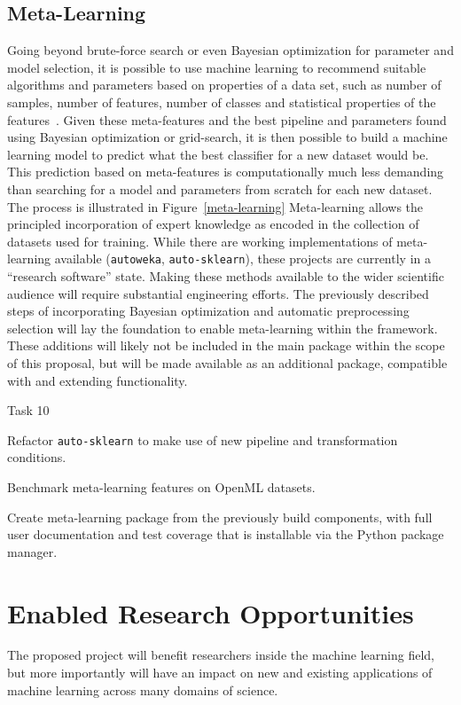 \subsection{Meta-Learning}
Going beyond brute-force search or even Bayesian optimization for parameter and
model selection, it is possible to use machine learning to recommend suitable
algorithms and parameters based on properties of a data set, such as number of
samples, number of features, number of classes and statistical properties of
the features~\autocite{luo2015review, feurer-nips2015}.
Given these meta-features and the best pipeline and parameters found using
Bayesian optimization or grid-search, it is then possible to build a machine
learning model to predict what the best classifier for a new dataset would be.
This prediction based on meta-features is computationally much less demanding
than searching for a model and parameters from scratch for each new dataset. The process
is illustrated in Figure~\ref{meta-learning}
Meta-learning allows the principled incorporation of expert knowledge as encoded
in the collection of datasets used for training.
While there are working implementations of meta-learning available
(\texttt{autoweka}, \texttt{auto-sklearn}),
these projects are currently in a ``research software'' state. Making these methods
available to the wider scientific audience will require substantial engineering
efforts. The previously described steps of incorporating Bayesian optimization
and automatic preprocessing selection will lay the foundation to enable
meta-learning within the
\sklearn{} framework. These additions will likely not be included in the main
\sklearn{} package within the scope of this proposal, but will be made available
as an additional package, compatible with and extending \sklearn{} functionality.
\begin{labeling}{Task 10}
    \item [Task 10] Refactor \texttt{auto-sklearn} to make use of new pipeline and transformation conditions.
    \item [Task 11] Benchmark meta-learning features on OpenML datasets.
    \item [Task 12] Create meta-learning package from the previously build
        components, with full user documentation and test coverage that is
        installable via the Python package manager.
\end{labeling}

\section{Enabled Research Opportunities}
The proposed project will benefit researchers inside the machine learning field,
but more importantly will have an impact on new and existing applications of machine
learning across many domains of science.

